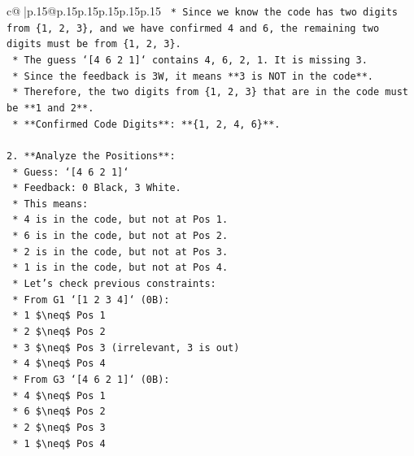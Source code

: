 \documentclass{article}
\begin{document}
{\begin{supertabular}{c@{$\;$}|p{.15\linewidth}@{}p{.15\linewidth}p{.15\linewidth}p{.15\linewidth}p{.15\linewidth}p{.15\linewidth}}
{{{\texttt{        *   Since we know the code has two digits from \{1, 2, 3\}, and we have confirmed 4 and 6, the remaining two digits must be from \{1, 2, 3\}.} \\
\texttt{        *   The guess `{[}4 6 2 1{]}` contains 4, 6, 2, 1. It is missing 3.} \\
\texttt{        *   Since the feedback is 3W, it means **3 is NOT in the code**.} \\
\texttt{        *   Therefore, the two digits from \{1, 2, 3\} that are in the code must be **1 and 2**.} \\
\texttt{        *   **Confirmed Code Digits**: **\{1, 2, 4, 6\}**.} \\
\\ 
\texttt{2.  **Analyze the Positions**:} \\
\texttt{    *   Guess: `{[}4 6 2 1{]}`} \\
\texttt{    *   Feedback: 0 Black, 3 White.} \\
\texttt{    *   This means:} \\
\texttt{        *   4 is in the code, but not at Pos 1.} \\
\texttt{        *   6 is in the code, but not at Pos 2.} \\
\texttt{        *   2 is in the code, but not at Pos 3.} \\
\texttt{        *   1 is in the code, but not at Pos 4.} \\
\texttt{    *   Let's check previous constraints:} \\
\texttt{        *   From G1 `{[}1 2 3 4{]}` (0B):} \\
\texttt{            *   1 \$\textbackslash{}neq\$ Pos 1} \\
\texttt{            *   2 \$\textbackslash{}neq\$ Pos 2} \\
\texttt{            *   3 \$\textbackslash{}neq\$ Pos 3 (irrelevant, 3 is out)} \\
\texttt{            *   4 \$\textbackslash{}neq\$ Pos 4} \\
\texttt{        *   From G3 `{[}4 6 2 1{]}` (0B):} \\
\texttt{            *   4 \$\textbackslash{}neq\$ Pos 1} \\
\texttt{            *   6 \$\textbackslash{}neq\$ Pos 2} \\
\texttt{            *   2 \$\textbackslash{}neq\$ Pos 3} \\
\texttt{            *   1 \$\textbackslash{}neq\$ Pos 4} \\
\\ 
}}}
\end{supertabular}}
\end{document}
